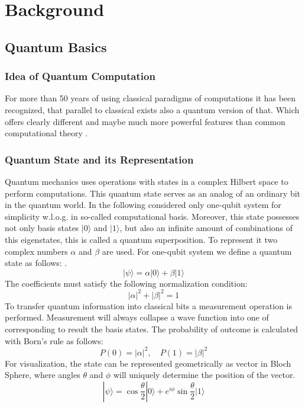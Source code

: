 
\chapter{Background}\label{chapter:background}
\section{Quantum Basics}
\subsection{Idea of Quantum Computation}
For more than 50 years of using classical paradigms of computations it has been recognized, 
that parallel to classical exists also a quantum version of that.
Which offers clearly different and maybe much more powerful features than common computational theory
\parencite{Barenco_1995}.

\subsection{Quantum State and its Representation}
Quantum mechanics uses operations with states in a complex Hilbert space to perform computations.
This quantum state serves as an analog of an ordinary bit in the quantum world.
In the following considered only one-qubit system for simplicity w.l.o.g. in so-called computational basis.
Moreover, this state possesses not only basis states \(|0\rangle\) and \(|1\rangle\),
but also an infinite amount of combinations of this eigenstates, this is called a quantum superposition. 
To represent it two complex numbers \(\alpha\) and \(\beta\) are used.
For one-qubit system we define a quantum state as follows:
\parencite{nielsen00}.
\[
|\psi\rangle = \alpha|0\rangle + \beta|1\rangle
\]
The coefficients must satisfy the following normalization condition:
\[
|\alpha|^2 + |\beta|^2 = 1
\]
To transfer quantum information into classical bits a measurement operation is performed.
Measurement will always collapse a wave function into one of corresponding to result the basis states. 
The probability of outcome is calculated with Born's rule as follows:
\[
P(0) = |\alpha|^2, \quad P(1) = |\beta|^2
\]
For visualization, the state can be represented geometrically as vector in Bloch Sphere, 
where angles \(\theta\) and \(\phi\) will uniquely determine the position of the vector. 
\[
|\psi\rangle = \cos\frac{\theta}{2}|0\rangle + e^{i\phi}\sin\frac{\theta}{2}|1\rangle
\]



